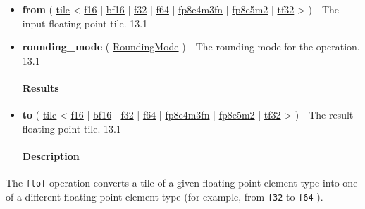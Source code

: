 \documentclass{article}
\begin{document}
\begin{itemize}
\item \textbf{from} ( \href{https://docs.nvidia.com/cuda/tile-ir/latest/sections/types.html#type-tile}{tile} < \href{https://docs.nvidia.com/cuda/tile-ir/latest/sections/types.html#subsection-element-types}{f16} | \href{https://docs.nvidia.com/cuda/tile-ir/latest/sections/types.html#subsection-element-types}{bf16} | \href{https://docs.nvidia.com/cuda/tile-ir/latest/sections/types.html#subsection-element-types}{f32} | \href{https://docs.nvidia.com/cuda/tile-ir/latest/sections/types.html#subsection-element-types}{f64} | \href{https://docs.nvidia.com/cuda/tile-ir/latest/sections/types.html#subsection-element-types}{fp8e4m3fn} | \href{https://docs.nvidia.com/cuda/tile-ir/latest/sections/types.html#subsection-element-types}{fp8e5m2} | \href{https://docs.nvidia.com/cuda/tile-ir/latest/sections/types.html#subsection-element-types}{tf32} > ) - The input floating-point tile. 13.1
\item \textbf{rounding\_mode} ( \href{https://docs.nvidia.com/cuda/tile-ir/latest/sections/operations.html#op-attribute-cuda-tile-ftof-roundingmode-attr}{RoundingMode} ) - The rounding mode for the operation. 13.1


\paragraph{Results}

\item \textbf{to} ( \href{https://docs.nvidia.com/cuda/tile-ir/latest/sections/types.html#type-tile}{tile} < \href{https://docs.nvidia.com/cuda/tile-ir/latest/sections/types.html#subsection-element-types}{f16} | \href{https://docs.nvidia.com/cuda/tile-ir/latest/sections/types.html#subsection-element-types}{bf16} | \href{https://docs.nvidia.com/cuda/tile-ir/latest/sections/types.html#subsection-element-types}{f32} | \href{https://docs.nvidia.com/cuda/tile-ir/latest/sections/types.html#subsection-element-types}{f64} | \href{https://docs.nvidia.com/cuda/tile-ir/latest/sections/types.html#subsection-element-types}{fp8e4m3fn} | \href{https://docs.nvidia.com/cuda/tile-ir/latest/sections/types.html#subsection-element-types}{fp8e5m2} | \href{https://docs.nvidia.com/cuda/tile-ir/latest/sections/types.html#subsection-element-types}{tf32} > ) - The result floating-point tile. 13.1


\paragraph{Description}

\end{itemize}
The \texttt{ftof} operation converts a tile of a given floating-point element type into one of a different floating-point element type (for example, from \texttt{f32} to \texttt{f64} ).
\end{document}
